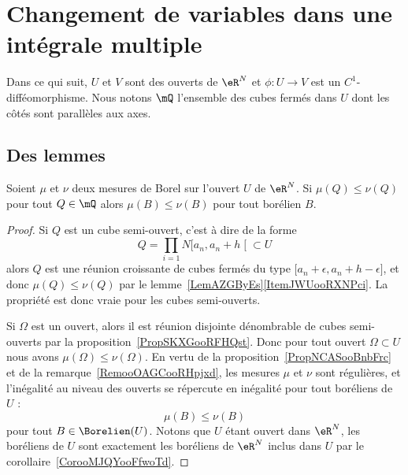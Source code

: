 \section{Changement de variables dans une intégrale multiple}

Dans ce qui suit, \( U\) et \( V\) sont des ouverts de \( \eR^N\) et \( \phi\colon U\to V\) est un \( C^1\)-difféomorphisme. Nous notons \( \mQ\) l'ensemble des cubes fermés dans \( U\) dont les côtés sont parallèles aux axes.

\subsection{Des lemmes}

\begin{lemma}      \label{LemooJYCGooIkkDVn}
    Soient \( \mu\) et \( \nu\) deux mesures de Borel sur l'ouvert \( U\) de \( \eR^N\). Si \( \mu(Q)\leq \nu(Q)\) pour tout \( Q\in \mQ\) alors \( \mu(B)\leq \nu(B)\) pour tout borélien \( B\).
\end{lemma}

\begin{proof}
    Si \( Q\) est un cube semi-ouvert, c'est à dire de la forme
    \begin{equation}
        Q=\prod_{i=1}N\mathopen[ a_n , a_n+h \mathclose[\subset U
    \end{equation}
    alors \( Q\) est une réunion croissante de cubes fermés du type \( \mathopen[ a_n+\epsilon , a_n+h-\epsilon \mathclose]\), et donc \( \mu(Q)\leq \nu(Q)\) par le lemme~\ref{LemAZGByEs}\ref{ItemJWUooRXNPci}. La propriété est donc vraie pour les cubes semi-ouverts.

    Si \( \Omega\) est un ouvert, alors il est réunion disjointe dénombrable de cubes semi-ouverts par la proposition~\ref{PropSKXGooRFHQst}. Donc pour tout ouvert \( \Omega\subset U\) nous avons \( \mu(\Omega)\leq\nu(\Omega)\). En vertu de la proposition~\ref{PropNCASooBnbFrc} et de la remarque~\ref{RemooOAGCooRHpjxd}, les mesures \( \mu\) et \( \nu\) sont régulières, et l'inégalité au niveau des ouverts se répercute en inégalité pour tout boréliens de \( U\) :
    \begin{equation}
        \mu(B)\leq \nu(B)
    \end{equation}
    pour tout \( B\in\Borelien(U)\). Notons que \( U\) étant ouvert dans \( \eR^N\), les boréliens de \( U\) sont exactement les boréliens de \( \eR^N\) inclus dans \( U\) par le corollaire~\ref{CorooMJQYooFfwoTd}.
\end{proof}

